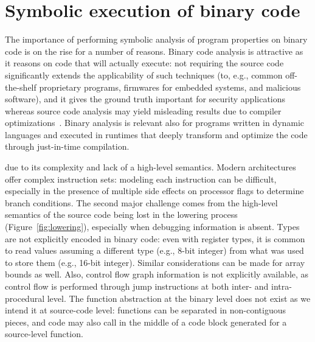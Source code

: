 
\section{Symbolic execution of binary code}
\label{se:symbolic-binary}

The importance of performing symbolic analysis of program properties on binary code is on the rise for a number of reasons. Binary code analysis is attractive as it reasons on code that will actually execute: not requiring the source code significantly extends the applicability of such techniques (to, e.g., common off-the-shelf proprietary programs, firmwares for embedded systems, and malicious software), and it gives the ground truth important for security applications whereas source code analysis may yield misleading results due to compiler optimizations~\cite{BITBLAZE-ICISS08}. %
Binary analysis is relevant also for programs written in dynamic languages and executed in runtimes that deeply transform and optimize the code through just-in-time compilation.



 due to its complexity and lack of a high-level semantics. Modern architectures offer complex instruction sets: modeling each instruction can be difficult, especially in the presence of multiple side effects on processor flags to determine branch conditions. The second major challenge comes from the high-level semantics of the source code being lost in the lowering process (Figure~\ref{fig:lowering}), especially when debugging information is absent. Types are not explicitly encoded in binary code: even with register types, it is common to read values assuming a different type (e.g., 8-bit integer) from what was used to store them (e.g., 16-bit integer). Similar considerations can be made for array bounds as well. Also, control flow graph information is not explicitly available, as control flow is performed through jump instructions at both inter- and intra-procedural level. The function abstraction at the binary level does not exist as we intend it at source-code level: functions can be separated in non-contiguous pieces, and code may also call in the middle of a code block generated for a source-level function.

